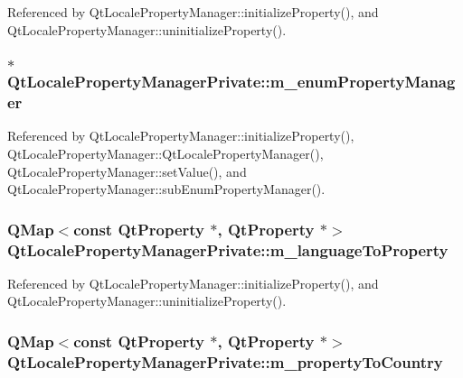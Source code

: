Referenced by Qt\+Locale\+Property\+Manager\+::initialize\+Property(), and Qt\+Locale\+Property\+Manager\+::uninitialize\+Property().

\subsubsection[{m\+\_\+enum\+Property\+Manager}]{$\ast$ Qt\+Locale\+Property\+Manager\+Private\+::m\+\_\+enum\+Property\+Manager}\label{classQtLocalePropertyManagerPrivate_a2398d86da983e6d47b0ee323bc2cbc10}


Referenced by Qt\+Locale\+Property\+Manager\+::initialize\+Property(), Qt\+Locale\+Property\+Manager\+::\+Qt\+Locale\+Property\+Manager(), Qt\+Locale\+Property\+Manager\+::set\+Value(), and Qt\+Locale\+Property\+Manager\+::sub\+Enum\+Property\+Manager().

\subsubsection[{m\+\_\+language\+To\+Property}]{\setlength{\rightskip}{0pt plus 5cm}Q\+Map$<$const {\bf Qt\+Property} $\ast$, {\bf Qt\+Property} $\ast$$>$ Qt\+Locale\+Property\+Manager\+Private\+::m\+\_\+language\+To\+Property}\label{classQtLocalePropertyManagerPrivate_a71e836601e2845e4e5b92a9eafa37b30}


Referenced by Qt\+Locale\+Property\+Manager\+::initialize\+Property(), and Qt\+Locale\+Property\+Manager\+::uninitialize\+Property().

\subsubsection[{m\+\_\+property\+To\+Country}]{\setlength{\rightskip}{0pt plus 5cm}Q\+Map$<$const {\bf Qt\+Property} $\ast$, {\bf Qt\+Property} $\ast$$>$ Qt\+Locale\+Property\+Manager\+Private\+::m\+\_\+property\+To\+Country}\label{classQtLocalePropertyManagerPrivate_a6a06e905734a8a659ff5ebc7dbd6a85a}


